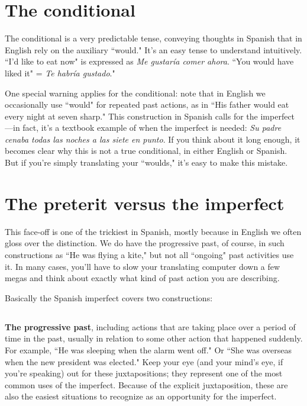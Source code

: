 \section{The conditional}

The conditional is a very predictable tense, conveying
thoughts in Spanish that in English rely on the auxiliary ``would." It's
an easy tense to understand intuitively. ``I'd like to eat now" is expressed as \emph{Me gustaría comer ahora}. ``You would have liked it" = \emph{Te habría gustado}."

One special warning applies for the conditional: note that in
English we occasionally use ``would" for repeated past actions, as in
``His father would eat every night at seven sharp." This construction
in Spanish calls for the imperfect---in fact, it's a textbook example of
when the imperfect is needed: \emph{Su padre cenaba todas las noches a las
siete en punto}. If you think about it long enough, it becomes clear why
this is not a true conditional, in either English or Spanish. But if you're
simply translating your ``woulds," it's easy to make this mistake.

\section{The preterit versus the imperfect}

This face-off is one of the trickiest in Spanish, mostly because
in English we often gloss over the distinction. We do have the progressive past, of course, in such constructions as ``He was flying a kite,"
but not all ``ongoing" past activities use it. In many cases, you'll have
to slow your translating computer down a few megas and think about
exactly what kind of past action you are describing.

Basically the Spanish imperfect covers two constructions:

\subsection{}

\textbf{The progressive past}, including actions that are taking
place over a period of time in the past, usually in relation to some
other action that happened suddenly. For example, ``He was sleeping
when the alarm went off." Or ``She was overseas when the new president was elected." Keep your eye (and your mind's eye, if you're speaking)
out for these juxtapositions; they represent one of the most common uses of the imperfect. Because of the explicit juxtaposition, these
are also the easiest situations to recognize as an opportunity for the
imperfect.

